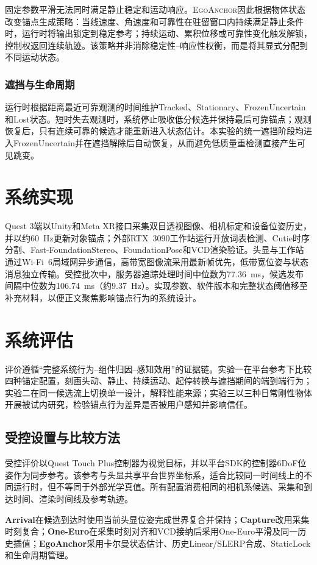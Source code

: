 \documentclass[10pt,journal,compsoc]{IEEEtran}
\newcommand{\oursname}{\textsc{EgoAnchor}}
\begin{document}
固定参数平滑无法同时满足静止稳定和运动响应。\oursname 因此根据物体状态改变锚点生成策略：当线速度、角速度和可靠性在驻留窗口内持续满足静止条件时，运行时将输出锁定到稳定参考；持续运动、累积位移或可靠性变化触发解锁，控制权返回连续轨迹。该策略并非消除稳定性--响应性权衡，而是将其显式分配到不同运动状态。

\subsubsection{遮挡与生命周期}
运行时根据距离最近可靠观测的时间维护Tracked、Stationary、FrozenUncertain和Lost状态。短时失去观测时，系统停止吸收低分候选并保持最后可靠锚点；观测恢复后，只有连续可靠的候选才能重新进入状态估计。本实验的统一遮挡阶段均进入FrozenUncertain并在遮挡解除后自动恢复，从而避免低质量重检测直接产生可见跳变。

\section{系统实现}
Quest 3端以Unity和Meta XR接口采集双目透视图像、相机标定和设备位姿历史，并以约60~Hz更新对象锚点；外部RTX~3090工作站运行开放词表检测、Cutie时序分割、Fast-FoundationStereo、FoundationPose和VCD渲染验证。头显与工作站通过Wi-Fi~6局域网异步通信，高带宽图像流采用最新帧优先，低带宽位姿与状态消息独立传输。受控批次中，服务器追踪处理时间中位数为77.36~ms，候选发布间隔中位数为106.74~ms（约9.37~Hz）。实现参数、软件版本和完整状态阈值移至补充材料，以便正文聚焦影响锚点行为的系统设计。

\section{系统评估}
评价遵循“完整系统行为--组件归因--感知效用”的证据链。实验一在平台参考下比较四种锚定配置，刻画头动、静止、持续运动、起停转换与遮挡期间的端到端行为；实验二在同一候选流上切换单一设计，解释性能来源；实验三以三种日常刚性物体开展被试内研究，检验锚点行为差异是否被用户感知并影响信任。

\subsection{受控设置与比较方法}
受控评价以Quest Touch Plus控制器为视觉目标，并以平台SDK的控制器6DoF位姿作为同步参考。该参考与头显共享平台世界坐标系，适合比较同一时间线上的不同运行时，但不等同于外部光学真值。所有配置消费相同的相机系候选、采集和到达时间、渲染时间线及参考轨迹。

\textbf{Arrival}在候选到达时使用当前头显位姿完成世界复合并保持；\textbf{Capture}改用采集时刻复合；\textbf{One-Euro}在采集时刻对齐和VCD接纳后采用One-Euro平滑及同一历史插值；\textbf{EgoAnchor}采用卡尔曼状态估计、历史Linear/SLERP合成、StaticLock和生命周期管理。
\end{document}
